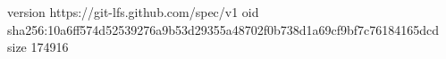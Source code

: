 version https://git-lfs.github.com/spec/v1
oid sha256:10a6ff574d52539276a9b53d29355a48702f0b738d1a69cf9bf7c76184165dcd
size 174916
